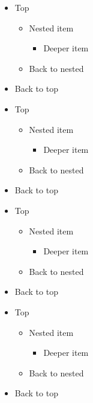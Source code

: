 \begin{itemize}
\item Top
\begin{itemize}
\item Nested item
\begin{itemize}
\item Deeper item
\end{itemize}
\item Back to nested
\end{itemize}
\item Back to top
\end{itemize}
\begin{itemize}
\item Top
\begin{itemize}
\item Nested item
\begin{itemize}
\item Deeper item
\end{itemize}
\item Back to nested
\end{itemize}
\item Back to top
\end{itemize}
\begin{itemize}
\item Top
\begin{itemize}
\item Nested item
\begin{itemize}
\item Deeper item
\end{itemize}
\item Back to nested
\end{itemize}
\item Back to top
\end{itemize}
\begin{frame}[t]
\begin{itemize}
\item Top
\begin{itemize}
\item Nested item
\begin{itemize}
\item Deeper item
\end{itemize}
\item Back to nested
\end{itemize}
\item Back to top
\end{itemize}
\end{frame}

